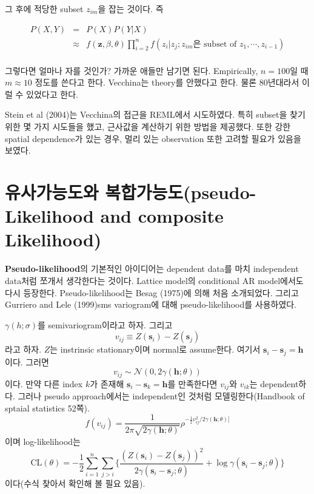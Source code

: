 \documentclass[b5paper,]{book}
\theoremstyle{definition}
\theoremstyle{definition}
\theoremstyle{definition}
\theoremstyle{remark}
\begin{document}
그 후에 적당한 subset \(z_{im}\)을 잡는 것이다. 즉

\begin{eqnarray*}
P(X,Y)&=&P(X)P(Y|X)\\
&\approx& f(\mathbf{z},\beta, \theta)\prod_{i=2}^{n}f(z_{i}|z_{j}; z_{im}\text{은 subset of }z_{1}, \cdots ,z_{i-1})\\
\end{eqnarray*}

그렇다면 얼마나 자를 것인가? 가까운 애들만 남기면 된다. Empirically,
\(n=100\)일 때 \(m \approx 10\) 정도를 쓴다고 한다. Vecchina는 theory를
안했다고 한다. 물론 80년대라서 이럴 수 있었다고 한다.

Stein et al (2004)는 Vecchina의 접근을 REML에서 시도하였다. 특히
subset을 찾기 위한 몇 가지 시도들을 했고, 근사값을 계산하기 위한 방법을
제공했다. 또한 강한 spatial dependence가 있는 경우, 멀리 있는
observation 또한 고려할 필요가 있음을 보였다.

\section{유사가능도와 복합가능도(pseudo-Likelihood and composite
Likelihood)}\label{-pseudo-likelihood-and-composite-likelihood}

\textbf{Pseudo-likelihood}의 기본적인 아이디어는 dependent data를 마치
independent data처럼 쪼개서 생각한다는 것이다. Lattice model의
conditional AR model에서도 다시 등장한다. Pseudo-likelihood는 Besag
(1975)에 의해 처음 소개되었다. 그리고 Gurriero and Lele (1999)sms
variogram에 대해 pseudo-likelihood를 사용하였다.

\(\gamma(h;\sigma)\)를 semivariogram이라고 하자. 그리고
\[v_{ij}\equiv Z(\mathbf{s}_{i})-Z(\mathbf{s}_{j})\] 라고 하자. \(Z\)는
instrinsic stationary이며 normal로 assume한다. 여기서
\(\mathbf{s}_{i}-\mathbf{s}_{j}=\mathbf{h}\)이다. 그러면
\[v_{ij} \sim \mathcal{N}(0, 2\gamma(\mathbf{h};\theta))\] 이다. 만약
다른 index \(k\)가 존재해 \(\mathbf{s}_{i}-\mathbf{s}_{k}=\mathbf{h}\)를
만족한다면 \(v_{ij}\)와 \(v_{ik}\)는 dependent하다. 그러나 pseudo
approach에서는 independent인 것처럼 모델링한다(Handbook of sptaial
statistics 52쪽).
\[f(v_{ij})=\frac{1}{2\pi\sqrt{2\gamma(\mathbf{h};\theta)}}\rho^{-\frac{1}{2}v_{ij}^{2}/2\gamma(\mathbf{h};\theta)]}\]
이며 log-likelihood는
\[\text{CL}(\theta)=-\frac{1}{2}\sum_{i=1}^{n}\sum_{j>i}\{ \frac{(Z(\mathbf{s}_{i})-Z(\mathbf{s}_{j}))^{2}}{2\gamma(\mathbf{s}_{i}-\mathbf{s}_{j};\theta)}+\log \gamma(\mathbf{s}_{i}-\mathbf{s}_{j};\theta) \}\]
이다(수식 찾아서 확인해 볼 필요 있음).
\end{document}
